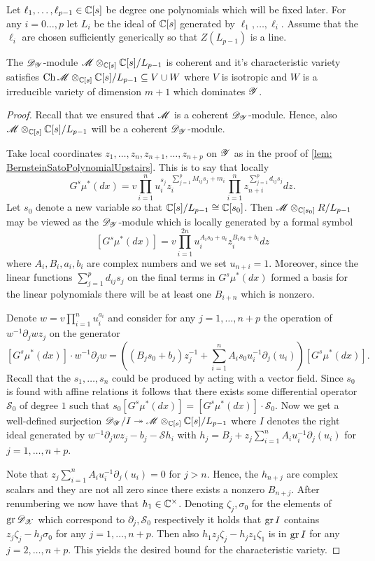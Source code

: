 Let $\ell_1,\ldots,\ell_{p-1}\in \mathbb{C}[s]$ be degree one polynomials which will be fixed later.
For any $i=0\ldots,p$ let $L_i$ be the ideal of $\mathbb{C}[s]$ generated by $\ell_1,\ldots,\ell_i$.
Assume that the $\ell_i$ are chosen sufficiently generically so that $Z(L_{p-1})$ is a line.
\begin{lemma}\label{lem: CharVarEstimateW}
  The $\mathscr{D}_{\mathscr{Y}}$-module $\mathscr{M}\otimes_{\mathbb{C}[s]}\mathbb{C}[s]/L_{p-1}$ is coherent and it's characteristic variety satisfies $\operatorname{Ch}\mathscr{M}\otimes_{\mathbb{C}[s]}\mathbb{C}[s]/L_{p-1} \subseteq V \cup W $ where $V$ is isotropic and $W$ is a irreducible variety of dimension $m +1$ which dominates $\mathscr{Y}$.
\end{lemma}
\begin{proof}
  Recall that we ensured that $\mathscr{M}$ is a coherent $\mathscr{D}_{\mathscr{Y}}$-module.
  Hence, also $\mathscr{M}\otimes_{\mathbb{C}[s]}\mathbb{C}[s]/L_{p-1}$ will be a coherent $\mathscr{D}_{\mathscr{Y}}$-module.

  Take local coordinates $z_1,\ldots,z_n,z_{n+1},\ldots,z_{n+p}$ on $\mathscr{Y}$ as in the proof of \cref{lem: BernsteinSatoPolynomialUpstairs}.
  This is to say that locally
  $$G^s \mu^*(dx) = v \prod_{i=1}^nu_i^{s_j}z_i^{\sum_{j=1}^p M_{ij}s_j + m_i}\prod_{i=1}^n z_{n+i}^{\sum_{j=1}^p d_{ij}s_j} dz.$$
  Let $s_0$ denote a new variable so that $\mathbb{C}[s]/L_{p-1}\cong \mathbb{C}[s_0]$.
  Then $\mathscr{M}\otimes_{\mathbb{C}[s_0]}R/L_{p-1}$ may be viewed as the $\mathscr{D}_{\mathscr{Y}}$-module which is locally generated by a formal symbol
  $$[G^s \mu^*(dx)] =v \prod_{i=1}^{2n} u_i^{A_i s_0 + a_i}z_i^{B_i s_0 + b_i} dz $$
  where $A_i,B_i,a_i,b_i$ are complex numbers and we set $u_{n+i}=1$.
  Moreover, since the linear functions $\sum_{j=1}^p d_{ij}s_j$ on the final terms in $G^s\mu^*(dx)$ formed a basis for the linear polynomials there will be at least one $B_{i+n}$ which is nonzero.

  Denote $w = v\prod_{i=1}^n u_i^{a_i}$ and consider for any $j=1,\ldots,n+p$ the operation of $w^{-1}\partial_j wz_j$ on the generator
  $$[G^s \mu^*(dx)]\cdot w^{-1}\partial_j w =((B_j s_0 + b_j)z_j^{-1} + \sum_{i=1}^{n} A_i s_0 u_i^{-1}\partial_j(u_i) )[G^s \mu^*(dx)].$$
  Recall that the $s_1,\ldots,s_n$ could be produced by acting with a vector field.
  Since $s_0$ is found with affine relations it follows that there exists some differential operator $\mathcal{S}_0$ of degree $1$ such that $s_0 [G^s \mu^*(dx)] = [G^s \mu^*(dx)]\cdot \mathcal{S}_0$.
  Now we get a well-defined surjection $\mathscr{D}_{\mathscr{Y}}/I \twoheadrightarrow \mathscr{M}\otimes_{\mathbb{C}[s]}\mathbb{C}[s]/L_{p-1}$ where $I$ denotes the right ideal generated by $w^{-1}\partial_j wz_j - b_j - \mathcal{S} h_i$ with $h_j = B_j + z_j\sum_{i=1}^n A_iu_i^{-1}\partial_j(u_i)$ for $j=1,\ldots, n+p$.

  Note that $ z_j\sum_{i=1}^n A_iu_i^{-1}\partial_j(u_i) = 0$ for $j>n$.
  Hence, the $h_{n+j}$ are complex scalars and they are not all zero since there exists a nonzero $B_{n+j}$.
  After renumbering we now have that $h_1 \in \mathbb{C}^\times$.
  Denoting $\zeta_j, \sigma_0$ for the elements of $\operatorname{gr} \mathscr{D}_{\mathscr{X}}$ which correspond to $\partial_j, \mathcal{S}_0$ respectively it holds that $\operatorname{gr} I$ contains $z_j \zeta_j - h_j \sigma_0$ for any $j=1,\ldots, n+p$.
  Then also $h_1z_j \zeta_j - h_jz_1 \zeta_1$ is in $\operatorname{gr} I$ for any $j=2,\ldots, n+p$.
  This yields the desired bound for the characteristic variety.
\end{proof}
